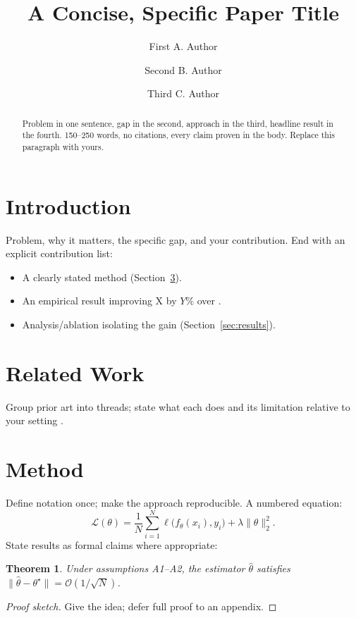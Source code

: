 \documentclass[11pt]{article}
\title{\bfseries A Concise, Specific Paper Title}
\author[1]{First A. Author}
\author[1,2]{Second B. Author}
\author[2]{Third C. Author}
\affil[1]{Department, Organization, \texttt{\{first,second\}@org.edu}}
\affil[2]{Second Organization, \texttt{third@org2.edu}}
\date{}   %
\theoremstyle{plain}
\newtheorem{theorem}{Theorem}
\theoremstyle{definition}
\begin{document}
\maketitle

\begin{abstract}
Problem in one sentence, gap in the second, approach in the third, headline
result in the fourth. 150--250 words, no citations, every claim proven in the
body. Replace this paragraph with yours.
\end{abstract}

\section{Introduction}
Problem, why it matters, the specific gap, and your contribution. End with an
explicit contribution list:
\begin{itemize}
\item A clearly stated method (Section~\ref{sec:method}).
\item An empirical result improving X by $Y\%$ over \citet{ref_baseline}.
\item Analysis/ablation isolating the gain (Section~\ref{sec:results}).
\end{itemize}

\section{Related Work}
Group prior art into threads; state what each does and its limitation relative to
your setting \citep{ref_survey,ref_method}.

\section{Method}\label{sec:method}
Define notation once; make the approach reproducible. A numbered equation:
\begin{equation}\label{eq:objective}
\mathcal{L}(\theta) = \frac{1}{N}\sum_{i=1}^{N}\ell\!\big(f_\theta(x_i), y_i\big) + \lambda\lVert\theta\rVert_2^2 .
\end{equation}
State results as formal claims where appropriate:
\begin{theorem}\label{thm:main}
Under assumptions A1--A2, the estimator $\hat\theta$ satisfies $\lVert\hat\theta-\theta^\star\rVert = \mathcal{O}(1/\sqrt{N})$.
\end{theorem}
\begin{proof}[Proof sketch] Give the idea; defer full proof to an appendix. \end{proof}
\end{document}

